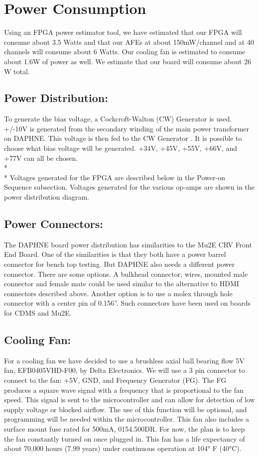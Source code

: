 \section{Power Consumption}
\label{sec:Power_Consumption}

Using an FPGA power estimator tool, we have estimated that our FPGA will consume about 3.5 Watts and that our AFEs at about 150mW/channel and at 40 channels will consume about 6 Watts. Our cooling fan is estimated to consume about 1.6W of power as well. We estimate that our board will consume about 26 W total. 

\subsection{Power Distribution: }

To generate the bias voltage, a Cockcroft-Walton (CW) Generator is used. +/-10V is generated from the secondary winding of the main power transformer on DAPHNE. This voltage is then fed to the CW Generator . It is possible to choose what bias voltage will be generated. +34V, +45V, +55V, +66V, and +77V can all be chosen.
\\*
\\* Voltages generated for the FPGA are described below in the Power-on Sequence subsection. Voltages generated for the various op-amps are shown in the power distribution diagram. 

\subsection{Power Connectors: }

The DAPHNE board power distribution has similarities to the Mu2E CRV Front End Board. One of the similarities is that they both have a power barrel connector for bench top testing. 
But DAPHNE also needs a different power connector. There are some options. A bulkhead connector, wires, mounted male connector and female mate could be used similar to the alternative to HDMI connectors described above. 
Another option is to use a molex through hole connector with a center pin of 0.156”. Such connectors have been used on boards for CDMS and Mu2E.

\subsection{Cooling Fan: }

For a cooling fan we have decided to use a brushless axial ball bearing flow 5V fan, EFB0405VHD-F00, by Delta Electronics.  We will use a 3 pin connector to connect to the fan: +5V, GND, and Frequency Generator (FG). The FG produces a square wave signal with a frequency that is proportional to the fan speed. This signal is sent to the microcontroller and can allow for detection of low supply voltage or blocked airflow. The use of this function will be optional, and programming will be needed within the microcontroller. 
This fan also includes a surface mount fuse rated for 500mA, 0154.500DR. For now, the plan is to keep the fan constantly turned on once plugged in. This fan has a life expectancy of about 70,000 hours (7.99 years) under continuous operation at 104° F (40°C). 


